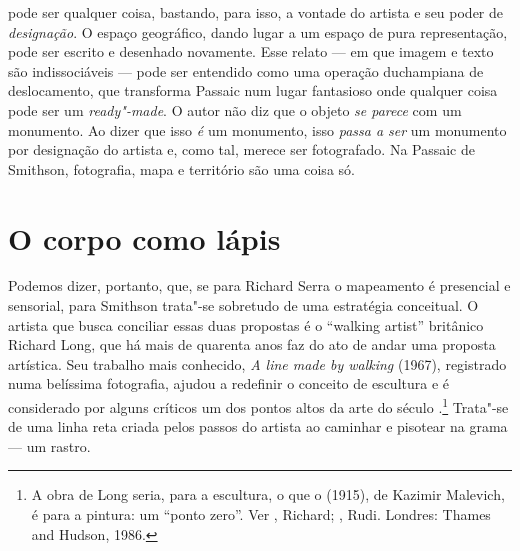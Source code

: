 pode ser qualquer coisa, bastando, para isso, a vontade do artista e seu
poder de \emph{designação}. O espaço geográfico, dando lugar a um espaço
de pura representação, pode ser escrito e desenhado novamente. Esse
relato --- em que imagem e texto são indissociáveis --- pode ser entendido
como uma operação duchampiana de deslocamento, que transforma Passaic
num lugar fantasioso onde qualquer coisa pode ser um \emph{ready"-made}.
O autor não diz que o objeto \emph{se parece} com um monumento. Ao dizer
que isso \emph{é} um monumento, isso \emph{passa a ser} um monumento por
designação do artista e, como tal, merece ser fotografado. Na Passaic de
Smithson, fotografia, mapa e território são uma coisa só.

\chapter{O corpo como lápis}

Podemos dizer, portanto, que, se para Richard Serra o mapeamento é
presencial e sensorial, para Smithson trata"-se sobretudo de uma
estratégia conceitual. O artista que busca conciliar essas duas
propostas é o ``walking artist'' britânico Richard Long, que há mais de
quarenta anos faz do ato de andar uma proposta artística. Seu trabalho
mais conhecido, \emph{A line made by walking} (1967), registrado numa
belíssima fotografia, ajudou a redefinir o conceito de escultura e é
considerado por alguns críticos um dos pontos altos da arte do século
.\footnote{A obra de Long seria, para a escultura, o que o
  {} (1915), de Kazimir Malevich, é para a pintura: um
  ``ponto zero''. Ver , Richard; , Rudi. {} Londres: Thames and Hudson, 1986.} Trata"-se de uma linha reta
criada pelos passos do artista ao caminhar e pisotear na grama --- um
rastro.

